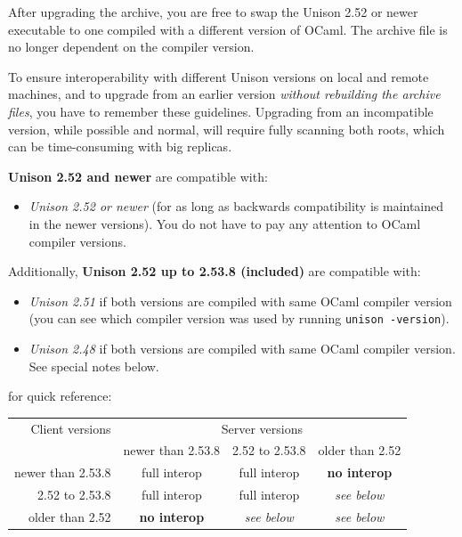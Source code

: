 \documentclass{article}
\begin{document}
After upgrading the archive, you are free to swap the Unison 2.52 or newer
executable to one compiled with a different version of OCaml.
The archive file is no longer dependent on the compiler version.


To ensure interoperability with different Unison versions on local and
remote machines, and to upgrade from an earlier version {\em without
rebuilding the archive files}, you have to remember these guidelines.
Upgrading from an incompatible version, while possible and normal, will
require fully scanning both roots, which can be time-consuming with big
replicas.

{\bf Unison 2.52 and newer} are compatible with:
\begin{itemize}
\item {\em Unison 2.52 or newer} (for as long as backwards compatibility
is maintained in the newer versions). You do not have to pay any attention
to OCaml compiler versions.
\end{itemize}

Additionally, {\bf Unison 2.52 up to 2.53.8 (included)} are compatible with:
\begin{itemize}
\item {\em Unison 2.51} if both versions are compiled with same OCaml
compiler version (you can see which compiler version was used by running
{\tt unison -version}).
\item {\em Unison 2.48} if both versions are compiled with same OCaml
compiler version.  See special notes below.
\end{itemize}

\vspace{1em}
 for quick reference:

\vspace{1em}
\begin{tabular}{r||c|c|c}
  Client versions & \multicolumn{3}{c}{Server versions} \\
  & newer than 2.53.8 & 2.52 to 2.53.8 & older than 2.52 \\
  \hline \hline
  newer than 2.53.8 & full interop & full interop & {\bf no interop} \\
  \hline
  2.52 to 2.53.8 & full interop & full interop & {\em see below} \\
  \hline
  older than 2.52 & {\bf no interop} & {\em see below} & {\em see below} \\
\end{tabular}
\end{document}

